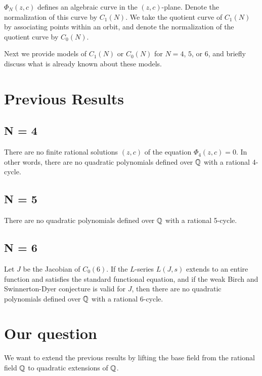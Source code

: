 $\Phi_N(z, c)$ defines an algebraic curve in the $(z,
c)$-plane. Denote the normalization of this curve by $C_1(N)$. We take
the quotient curve of $C_1(N)$ by associating points within an orbit,
and denote the normalization of the quotient curve by $C_0(N)$.

Next we provide models of $C_1(N)$ or $C_0(N)$ for $N = 4$, $5$, or
$6$, and briefly discuss what is already known about these models.

\section{Previous Results}
\label{sec:prevres}

\subsection{N = 4}
\begin{theorem}[Morton]
  There are no finite rational solutions $(z, c)$ of the equation
  $\Phi_4(z, c) = 0$. In other words, there are no quadratic
  polynomials defined over $\mathbb{Q}$ with a rational 4-cycle.
\end{theorem}

\subsection{N = 5}
\begin{theorem}
  There are no quadratic polynomials defined over $\mathbb{Q}$ with a rational
  5-cycle.
\end{theorem}

\subsection{N = 6}
\begin{theorem}[Stoll]
  Let $J$ be the Jacobian of $C_0(6)$. If the $L$-series $L(J,s)$
  extends to an entire function and satisfies the standard functional
  equation, and if the weak Birch and Swinnerton-Dyer conjecture is
  valid for $J$, then there are no quadratic polynomials defined over
  $\mathbb{Q}$ with a rational 6-cycle.
\end{theorem}

\section{Our question}
\label{sec:ourq}

We want to extend the previous results by lifting the base field from
the rational field $\mathbb{Q}$ to quadratic extensions of $\mathbb{Q}$.

